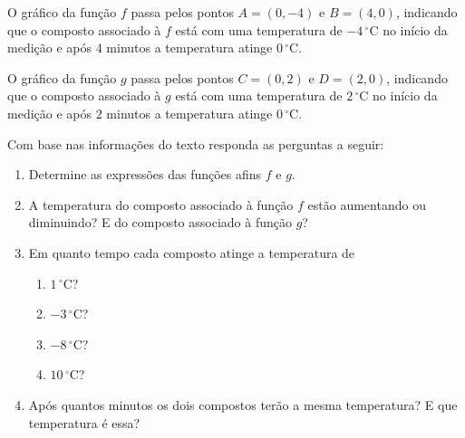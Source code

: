 \documentclass[10 pt,usenames,dvipsnames, oneside]{article}
\begin{document}
O gráfico da função \(f\) passa pelos pontos \(A=(0,-4)\) e \(B=(4,0)\), indicando que o composto associado à \(f\) está com uma temperatura de \(-4\,^{\circ}\mathrm{C}\) no início da medição e após \(4\) minutos a temperatura atinge \(0\,^{\circ}\mathrm{C}\).

O gráfico da função \(g\) passa pelos pontos \(C=(0,2)\) e \(D=(2,0)\), indicando que o composto associado à \(g\) está com uma temperatura de \(2\,^{\circ}\mathrm{C}\) no início da medição e após \(2\) minutos a temperatura atinge \(0\,^{\circ}\mathrm{C}\).

Com base nas informações do texto responda as perguntas a seguir:
\begin{enumerate}
\item {} 
Determine as expressões das funções afins \(f\) e \(g\).

\item {} 
A temperatura do composto associado à função \(f\) estão aumentando ou diminuindo? E do composto associado à função \(g\)?

\item {} 
Em quanto tempo cada composto atinge a temperatura de

\begin{enumerate}
\item \(1\,^{\circ}\mathrm{C}\)?

\item \(-3\,^{\circ}\mathrm{C}\)?

\item \(-8\,^{\circ}\mathrm{C}\)?

\item \(10\,^{\circ}\mathrm{C}\)?
\end{enumerate}
\item {} 
Após quantos minutos os dois compostos terão a mesma temperatura? E que temperatura é essa?

\end{enumerate}
\end{document}
